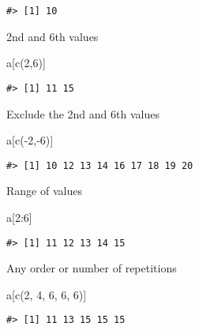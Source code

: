 \documentclass[
]{book}
\newenvironment{Shaded}{\begin{snugshade}}{\end{snugshade}}
\newcommand{\DecValTok}[1]{\textcolor[rgb]{0.00,0.00,0.81}{#1}}
\newcommand{\FunctionTok}[1]{\textcolor[rgb]{0.00,0.00,0.00}{#1}}
\newcommand{\NormalTok}[1]{#1}
\newcommand{\SpecialCharTok}[1]{\textcolor[rgb]{0.00,0.00,0.00}{#1}}
\begin{document}
\begin{verbatim}
#> [1] 10
\end{verbatim}

2nd and 6th values

\begin{Shaded}
\begin{Highlighting}[]
\NormalTok{a[}\FunctionTok{c}\NormalTok{(}\DecValTok{2}\NormalTok{,}\DecValTok{6}\NormalTok{)]}
\end{Highlighting}
\end{Shaded}

\begin{verbatim}
#> [1] 11 15
\end{verbatim}

Exclude the 2nd and 6th values

\begin{Shaded}
\begin{Highlighting}[]
\NormalTok{a[}\FunctionTok{c}\NormalTok{(}\SpecialCharTok{{-}}\DecValTok{2}\NormalTok{,}\SpecialCharTok{{-}}\DecValTok{6}\NormalTok{)]}
\end{Highlighting}
\end{Shaded}

\begin{verbatim}
#> [1] 10 12 13 14 16 17 18 19 20
\end{verbatim}

Range of values

\begin{Shaded}
\begin{Highlighting}[]
\NormalTok{a[}\DecValTok{2}\SpecialCharTok{:}\DecValTok{6}\NormalTok{]}
\end{Highlighting}
\end{Shaded}

\begin{verbatim}
#> [1] 11 12 13 14 15
\end{verbatim}

Any order or number of repetitions

\begin{Shaded}
\begin{Highlighting}[]
\NormalTok{a[}\FunctionTok{c}\NormalTok{(}\DecValTok{2}\NormalTok{, }\DecValTok{4}\NormalTok{, }\DecValTok{6}\NormalTok{, }\DecValTok{6}\NormalTok{, }\DecValTok{6}\NormalTok{)]}
\end{Highlighting}
\end{Shaded}

\begin{verbatim}
#> [1] 11 13 15 15 15
\end{verbatim}
\end{document}
